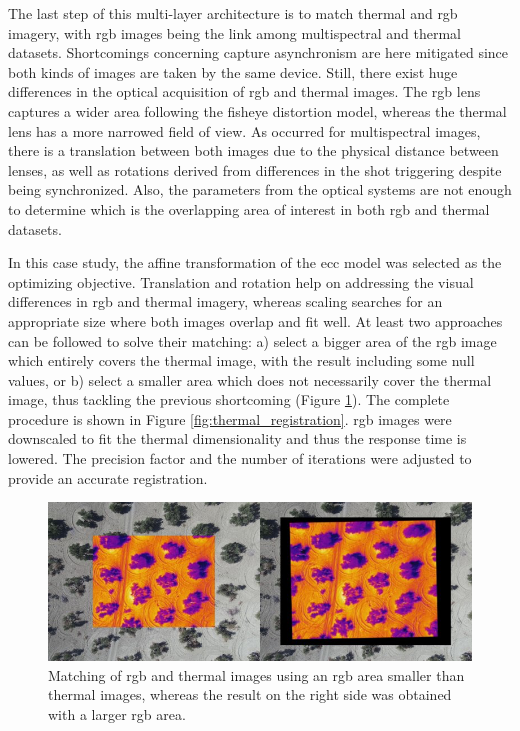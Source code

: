 The last step of this multi-layer architecture is to match thermal and \acrshort{rgb} imagery, with \acrshort{rgb} images being the link among multispectral and thermal datasets. Shortcomings concerning capture asynchronism are here mitigated since both kinds of images are taken by the same device. Still, there exist huge differences in the optical acquisition of \acrshort{rgb} and thermal images. The \acrshort{rgb} lens captures a wider area following the fisheye distortion model, whereas the thermal lens has a more narrowed field of view. As occurred for multispectral images, there is a translation between both images due to the physical distance between lenses, as well as rotations derived from differences in the shot triggering despite being synchronized. Also, the parameters from the optical systems are not enough to determine which is the overlapping area of interest in both \acrshort{rgb} and thermal datasets. 

In this case study, the affine transformation of the \acrshort{ecc} model was selected as the optimizing objective. Translation and rotation help on addressing the visual differences in \acrshort{rgb} and thermal imagery, whereas scaling searches for an appropriate size where both images overlap and fit well. At least two approaches can be followed to solve their matching: a) select a bigger area of the \acrshort{rgb} image which entirely covers the thermal image, with the result including some null values, or b) select a smaller area which does not necessarily cover the thermal image, thus tackling the previous shortcoming (Figure \ref{fig:thermal_comparative}). The complete procedure is shown in Figure \ref{fig:thermal_registration}. \acrshort{rgb} images were downscaled to fit the thermal dimensionality and thus the response time is lowered. The precision factor and the number of iterations were adjusted to provide an accurate registration. 

\begin{figure}
    \includegraphics{figs/image_fusion/thermal_comparative.png}
    \caption{Matching of \acrshort{rgb} and thermal images using an \acrshort{rgb} area smaller than thermal images, whereas the result on the right side was obtained with a larger \acrshort{rgb} area. }
    \label{fig:thermal_comparative}
\end{figure}

